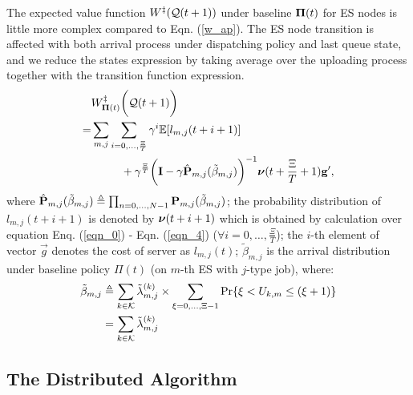 The expected value function $W^{\ddagger}(\mathcal{Q}({t+1}))$ under baseline $\boldsymbol{\Pi}({t})$ for ES nodes is little more complex compared to Eqn. (\ref{w_ap}).
The ES node transition is affected with both arrival process under dispatching policy and last queue state, and we reduce the states expression by taking average over the uploading process together with the transition function expression.
\begin{align}
    &W^{\ddagger}_{\boldsymbol{\Pi}({t})}\bigg(\mathcal{Q}({t+1})\bigg)
    \nonumber\\
    =& \sum_{m,j}\sum_{i=0,\dots,\frac{\Xi}{T}} \gamma^{i} \mathbb{E}[ l_{m,j}({t+i+1}) ]
    \nonumber\\
    &~~~~~~~~+ \gamma^{\frac{\Xi}{T}} \bigg( \mathbf{I} - \gamma \hat{\mathbf{P}}_{m,j}(\tilde{\beta}_{m,j}) \bigg)^{-1} \boldsymbol{\nu}({t+\frac{\Xi}{T}+1}) \mathbf{g}',
\end{align}
where $\hat{\mathbf{P}}_{m,j}(\tilde{\beta}_{m,j}) \triangleq \prod_{n=0,\dots,N-1} \mathbf{P}_{m,j}(\tilde{\beta}_{m,j})$;
the probability distribution of $l_{m,j}({t+i+1})$ is denoted by $\boldsymbol{\nu}({t+i+1})$ which is obtained by calculation over equation Enq. (\ref{eqn_0}) - Eqn. (\ref{eqn_4}) ($\forall i=0,\dots,\frac{\Xi}{T}$);
the $i$-th element of vector $\vec{g}$ denotes the cost of server as $l_{m,j}(t)$;
$\tilde{\beta}_{m,j}$ is the arrival distribution under baseline policy $\Pi({t})$ (on $m$-th ES with $j$-type job), where:
\begin{align}
    \tilde{\beta}_{m,j} &\triangleq \sum_{k\in\mathcal{K}} \tilde{\lambda}^{(k)}_{m,j} \times \sum_{\xi=0,\dots,\Xi-1} \Pr\{ \xi<U_{k,m}\leq(\xi+1) \}
        \nonumber\\
    ~~~~&= \sum_{k\in\mathcal{K}} \tilde{\lambda}^{(k)}_{m,j}
\end{align}

\subsection{The Distributed Algorithm}

